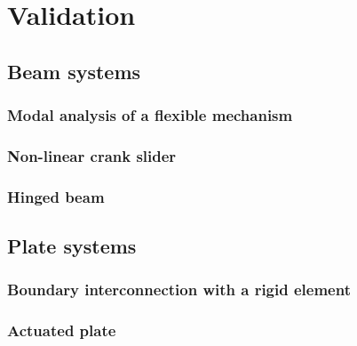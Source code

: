 \chapter{Validation}


\section{Beam systems}
\subsection{Modal analysis of a flexible mechanism}
\subsection{Non-linear crank slider}
\subsection{Hinged beam}

\section{Plate systems}
\subsection{Boundary interconnection with a rigid element}
\subsection{Actuated plate}